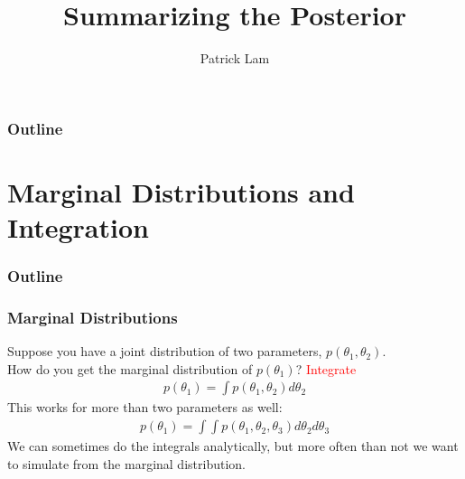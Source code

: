 \documentclass[handout]{beamer}
\author{Patrick Lam}
\title{Summarizing the Posterior}
\date{}
\begin{document}
\newcommand{\red}{\textcolor{red}}
\newcommand{\blue}{\textcolor{blue}}
\newcommand{\purple}{\textcolor{purple}}

\frame{\titlepage}

\begin{frame}
\frametitle{Outline}
\tableofcontents
\end{frame}

\section{Marginal Distributions and Integration}

\begin{frame}
\frametitle{Outline}
\tableofcontents[currentsection]
\end{frame}

\begin{frame}
\frametitle{Marginal Distributions}
\pause
Suppose you have a joint distribution of two parameters, $p(\theta_1, \theta_2)$.\\
\pause
\bigskip
How do you get the marginal distribution of $p(\theta_1)$?  \pause \red{Integrate}
\pause
\begin{eqnarray*}
p(\theta_1) = \int p(\theta_1, \theta_2) d\theta_2
\end{eqnarray*}
\pause
This works for more than two parameters as well:
\pause
\begin{eqnarray*}
p(\theta_1) = \int \int p(\theta_1, \theta_2, \theta_3) d\theta_2 d\theta_3
\end{eqnarray*}
\pause
We can sometimes do the integrals analytically, but more often than
not we want to simulate from the marginal distribution.
\end{frame}
\end{document}
